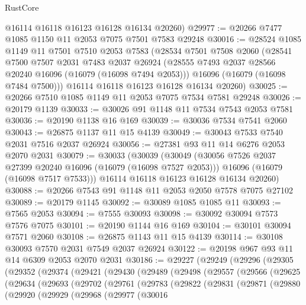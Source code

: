 \begin{lexlean}{RustCore}
\begin{coremodule}
      @16114
      @16118
      @16123
      @16128
      @16134
      @20260)
@29977 := @20266 @7477 @1085 @1150 @11 @2053 @7075 @7501 @7583 @29248
@30016 := @28524
    @1085
    @1149
    @11
    @7501
    @7510
    @2053
    @7583
    (@28534
      @7501
      @7508
      @2060
      (@28541
        @7500
        @7507
        @2031
        @7483
        @2037
        @26924
        (@28555 @7493 @2037 @28566 @20240 @16096 (@16079 (@16098 @7494 @2053)))
        @16096
        (@16079 (@16098 @7484 @7500)))
      @16114
      @16118
      @16123
      @16128
      @16134
      @20260)
@30025 := @20266 @7510 @1085 @1149 @11 @2053 @7075 @7534 @7581 @29248
@30026 := @20179 @1139
@30033 := @30026 @91 @1148 @11 @7534 @7543 @2053 @7581
@30036 := @20190 @1138 @16 @169
@30039 := @30036 @7534 @7541 @2060
@30043 := @26875 @1137 @11 @15 @4139
@30049 := @30043 @7533 @7540 @2031 @7516 @2037 @26924
@30056 := @27381 @93 @11 @14 @6276 @2053 @2070 @2031
@30079 := @30033
    (@30039
      (@30049
        (@30056 @7526 @2037 @27399 @20240 @16096 (@16079 (@16098 @7527 @2053)))
        @16096
        (@16079 (@16098 @7517 @7533)))
      @16114
      @16118
      @16123
      @16128
      @16134
      @20260)
@30088 := @20266 @7543 @91 @1148 @11 @2053 @2050 @7578 @7075 @27102
@30089 := @20179 @1145
@30092 := @30089 @1085 @1085 @11
@30093 := @7565 @2053
@30094 := @7555 @30093
@30098 := @30092 @30094 @7573 @7576 @7075
@30101 := @20190 @1144 @16 @169
@30104 := @30101 @30094 @7571 @2060
@30108 := @26875 @1143 @11 @15 @4139
@30114 := @30108 @30093 @7570 @2031 @7549 @2037 @26924
@30122 := @20198 @967 @93 @11 @14 @6309 @2053 @2070 @2031
@30186 := @29227
    (@29249
      (@29296
        (@29305
          (@29352
            (@29374
              (@29421
                (@29430
                  (@29489
                    (@29498
                      (@29557
                        (@29566
                          (@29625
                            (@29634
                              (@29693
                                (@29702
                                  (@29761
                                    (@29783
                                      (@29822
                                        (@29831
                                          (@29871
                                            (@29880
                                              (@29920
                                                (@29929
                                                  (@29968
                                                    (@29977
                                                      (@30016

\end{coremodule}
\end{lexlean}
